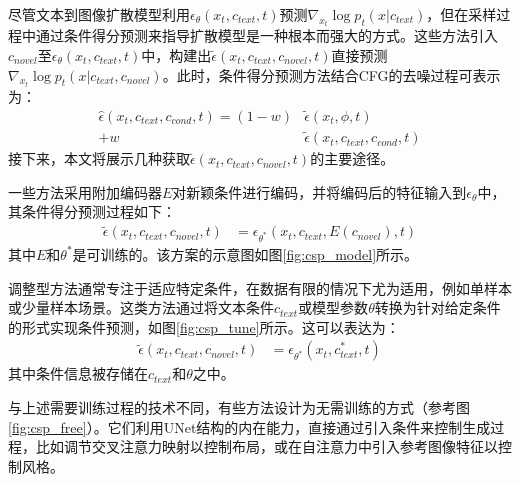 尽管文本到图像扩散模型利用$\epsilon_{\theta}(x_t, c_{text}, t)$预测$\nabla_{x_{t}}\log p_t(x|c_{text})$，但在采样过程中通过条件得分预测来指导扩散模型是一种根本而强大的方式。这些方法引入$c_{novel}$至$\epsilon_{\theta}(x_t, c_{text}, t)$中，构建出$\tilde\epsilon(x_t, c_{text}, c_{novel}, t)$直接预测$\nabla_{x_{t}}\log p_t(x|c_{text},c_{novel})$。此时，条件得分预测方法结合CFG的去噪过程可表示为：
\begin{align}
    \label{eq:cfg_cond}
    \hat\epsilon(x_t, c_{text}, c_{cond}, t)=(1-w)&\tilde\epsilon(x_t, \phi, t) \nonumber\\
    +w&\tilde\epsilon(x_t, c_{text}, c_{cond}, t)
\end{align}
接下来，本文将展示几种获取$\tilde\epsilon(x_t, c_{text}, c_{novel}, t)$的主要途径。

 一些方法采用附加编码器$E$对新颖条件进行编码，并将编码后的特征输入到$\epsilon_\theta$中，其条件得分预测过程如下：
\begin{align}
\tilde\epsilon(x_t, c_{text}, c_{novel}, t)&=\epsilon_{\theta^*}(x_t, c_{text}, E(c_{novel}), t)
\end{align}
其中$E$和$\theta^*$是可训练的。该方案的示意图如图\ref{fig:csp_model}所示。

 调整型方法通常专注于适应特定条件，在数据有限的情况下尤为适用，例如单样本或少量样本场景。这类方法通过将文本条件$c_{text}$或模型参数$\theta$转换为针对给定条件的形式实现条件预测，如图\ref{fig:csp_tune}所示。这可以表达为：
\begin{align}
\tilde\epsilon(x_t, c_{text}, c_{novel}, t)&=\epsilon_{\theta^*}(x_t, c^*_{text}, t)
\end{align}
其中条件信息被存储在$c_{text}$和$\theta$之中。

与上述需要训练过程的技术不同，有些方法设计为无需训练的方式（参考图\ref{fig:csp_free}）。它们利用UNet结构的内在能力，直接通过引入条件来控制生成过程，比如调节交叉注意力映射以控制布局\cite{he2023localized,zhao2023loco}，或在自注意力中引入参考图像特征以控制风格\cite{hertz2023style}。
